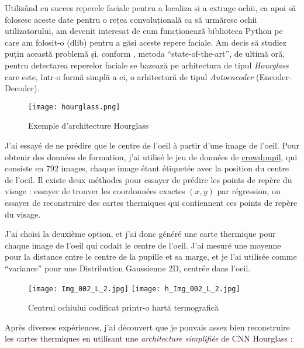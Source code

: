 Utilizând cu succes reperele faciale pentru a localiza și a extrage ochii, ca apoi să folosesc aceste date pentru o rețea convoluțională ca să urmăresc ochii utilizatorului, am devenit interesat de cum funcționează biblioteca Python pe care am folosit-o (dlib) pentru a găsi aceste repere faciale.
Am decis să studiez puțin această problemă și, conform \cite{paper_stacked_hourglass}, metoda ``state-of-the-art'', de ultimă oră, pentru detectarea reperelor faciale se bazează pe arhitectura de tipul \emph{Hourglass} care este, într-o formă simplă a ei, o arhitectură de tipul \emph{Autoencoder} (Encoder-Decoder).




\begin{figure}[h]
    \centering
    \texttt{[image: hourglass.png]}
    \caption{Exemple d'architecture Hourglass}
\end{figure}


J'ai essayé de ne prédire que le centre de l'oeil à partir d'une image de l'oeil.
Pour obtenir des données de formation, j'ai utilisé le jeu de données de \href{http://cs.uef.fi/pupoint/}{crowdpupil}, qui consiste en $792$ images, chaque image étant étiquetée avec la position du centre de l'oeil.
Il existe deux méthodes pour essayer de prédire les points de repère du visage : essayer de trouver les coordonnées exactes $(x, y)$ par régression, ou essayer de reconstruire des cartes thermiques qui contiennent ces points de repère du visage.


J'ai choisi la deuxième option, et j'ai donc généré une carte thermique pour chaque image de l'oeil qui codait le centre de l'oeil.
J'ai mesuré une moyenne pour la distance entre le centre de la pupille et sa marge, et je l'ai utilisée comme ``variance'' pour une Distribution Gaussienne 2D, centrée dans l'oeil.

\begin{figure}[h]
    \centering
    \texttt{[image: Img\_002\_L\_2.jpg]}
    \texttt{[image: h\_Img\_002\_L\_2.jpg]}
    \caption{Centrul ochiului codificat printr-o hartă termografică}
\end{figure}

\clearpage


Après diverses expériences, j'ai découvert que je pouvais assez bien reconstruire les cartes thermiques en utilisant une \emph{architecture simplifiée} de CNN Hourglass :


